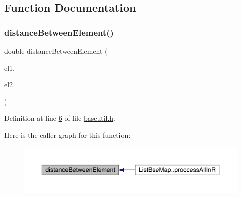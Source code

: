 \subsection{Function Documentation}
\mbox{\label{a00068_a1ab36c07a61bd9f450ed0ac1ba68ed94}} 
\subsubsection{\texorpdfstring{distance\+Between\+Element()}{distanceBetweenElement()}}
{\footnotesize\ttfamily double distance\+Between\+Element (\begin{DoxyParamCaption}\item[{\hyperlink{a00137}{I\+Base\+Game\+Element} $\ast$}]{el1,  }\item[{\hyperlink{a00137}{I\+Base\+Game\+Element} $\ast$}]{el2 }\end{DoxyParamCaption})}



Definition at line \hyperlink{a00068_source_l00006}{6} of file \hyperlink{a00068_source}{baseutil.\+h}.

Here is the caller graph for this function\+:
\nopagebreak
\begin{figure}[H]
\begin{center}
\leavevmode
\includegraphics[width=350pt]{da/d24/a00068_a1ab36c07a61bd9f450ed0ac1ba68ed94_icgraph}
\end{center}
\end{figure}

